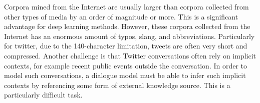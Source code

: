\documentclass[bsc,frontabs,twoside,singlespacing,parskip,deptreport]{infthesis}     %
\begin{document}
Corpora mined from the Internet are usually larger than corpora collected from other types of media by an order of magnitude or more. This is a significant advantage for deep learning methods. However, these corpora collected from the Internet has an enormous amount of typos, slang, and abbreviations. Particularly for twitter, due to the 140-character limitation, tweets are often very short and compressed\cite{serban2018survey}. Another challenge is that Twitter conversations often rely on implicit contexts, for example recent public events outside the conversation. In order to model such conversations, a dialogue model must be able to infer such implicit contexts by referencing some form of external knowledge source. This is a particularly difficult task.


\end{document}
